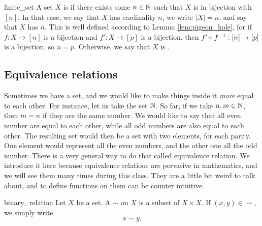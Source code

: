 \begin{cdef}{}{finite_set}
    A set \( X \) is  if there exists some \( n \in \mathbb{N} \) such that \( X \) is in bijection with \( [n] \). In that case, we say that \( X \) has cardinality \( n \), we write \( |X| = n \), and say that \( X \) has  \( n \). This is well defined according to Lemma \ref{lem:pigeon_hole}, for if \( f : X \to [n] \) is a bijection and \( f' :  X \to [p] \) is a bijection, then \( f' \circ f^{-1} : [n] \to [p]  \) is a bijection, so \( n = p \). 
    Otherwise, we say that \( X \) is .
\end{cdef}


\subsection{Equivalence relations}

Sometimes we have a set, and we would like to make things inside it \textit{more} equal to each other. For instance, let us take the set \( \mathbb{N} \). So far, if we take \( n, m \in \mathbb{N} \), then \( m = n \) if they are the same number. We would like to say that all even number are equal to each other, while all odd numbers are also equal to each other. The resulting set would then be a set with two elements, for each parity. One element would represent all the even numbers, and the other one all the odd number. There is a very general way to do that called equivalence relation. We introduce it here because equivalence relations are pervasive in mathematics, and we will see them many times during this class. They are a little bit weird to talk about, and to define functions on them can be counter intuitive. 

\begin{cdef}{}{binary_relation}
    Let \( X \) be a set. A  \( \sim \) on \( X \) is a subset of \( X \times X \). If \( (x, y) \in \sim \), we simply write
    \begin{equation*}
        x \sim y.
    \end{equation*} 
\end{cdef}


